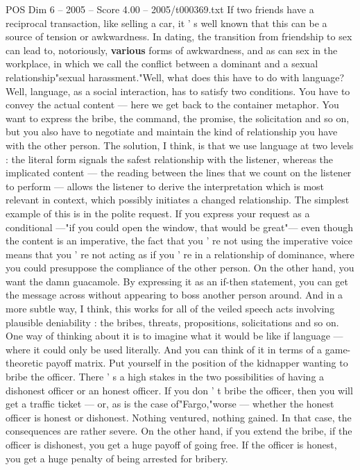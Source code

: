 \begin{textsample}{POS Dim 6 – 2005 – Score 4.00 – 2005/t000369.txt}
If two friends have a reciprocal transaction, like selling a car, it ' s well known that this can be a source of tension or awkwardness.
In dating, the transition from friendship to sex can lead to, notoriously, \textbf{various} forms of awkwardness, and as can sex in the workplace, in which we call the conflict between a dominant and a sexual relationship"sexual harassment."Well, what does this have to do with language?
Well, language, as a social interaction, has to satisfy two conditions.
You have to convey the actual content — here we get back to the container metaphor.
You want to express the bribe, the command, the promise, the solicitation and so on, but you also have to negotiate and maintain the kind of relationship you have with the other person.
The solution, I think, is that we use language at two levels : the literal form signals the safest relationship with the listener, whereas the implicated content — the reading between the lines that we count on the listener to perform — allows the listener to derive the interpretation which is most relevant in context, which possibly initiates a changed relationship.
The simplest example of this is in the polite request.
If you express your request as a conditional —"if you could open the window, that would be great"— even though the content is an imperative, the fact that you ' re not using the imperative voice means that you ' re not acting as if you ' re in a relationship of dominance, where you could presuppose the compliance of the other person.
On the other hand, you want the damn guacamole.
By expressing it as an if-then statement, you can get the message across without appearing to boss another person around.
And in a more subtle way, I think, this works for all of the veiled speech acts involving plausible deniability : the bribes, threats, propositions, solicitations and so on.
One way of thinking about it is to imagine what it would be like if language — where it could only be used literally.
And you can think of it in terms of a game-theoretic payoff matrix.
Put yourself in the position of the kidnapper wanting to bribe the officer.
There ' s a high stakes in the two possibilities of having a dishonest officer or an honest officer.
If you don ' t bribe the officer, then you will get a traffic ticket — or, as is the case of"Fargo,"worse — whether the honest officer is honest or dishonest.
Nothing ventured, nothing gained.
In that case, the consequences are rather severe.
On the other hand, if you extend the bribe, if the officer is dishonest, you get a huge payoff of going free.
If the officer is honest, you get a huge penalty of being arrested for bribery.

\end{textsample}
